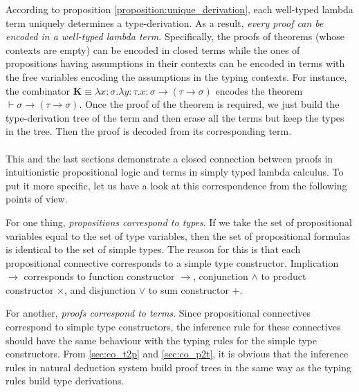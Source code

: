According to proposition \ref{proposition:unique_derivation}, each well-typed lambda term uniquely determines a type-derivation. As a result, \emph{every proof can be encoded in a well-typed lambda term}. Specifically, the proofs of theorems (whose contexts are empty) can be encoded in closed terms while the ones of propositions having assumptions in their contexts can be encoded in terms with the free variables encoding the assumptions in the typing contexts. For instance, the combinator $ \textbf{K} \equiv \lambda x:\sigma . \lambda y:\tau . x: \sigma \to (\tau \to \sigma) $ encodes the theorem $ \vdash \sigma \to (\tau \to \sigma) $. Once the proof of the theorem is required, we just build the type-derivation tree of the term and then erase all the terms but keep the types in the tree. Then the proof is decoded from its corresponding term.
\\
\\
This and the last sections demonstrate a closed connection between proofs in intuitionistic propositional logic and terms in simply typed lambda calculus. To put it more specific, let us have a look at this correspondence from the following points of view.

For one thing, \emph{propositions correspond to types}. If we take the set of propositional variables equal to the set of type variables, then the set of propositional formulas is identical to the set of simple types. The reason for this is that each propositional connective corresponds to a simple type constructor. Implication $ \to $ corresponds to function constructor $ \to $, conjunction $ \land $ to product constructor $ \times $, and disjunction $ \lor $ to sum constructor $ + $.

For another, \emph{proofs correspond to terms}. Since propositional connectives correspond to simple type constructors, the inference rule for these connectives should have the same behaviour with the typing rules for the simple type constructors. From \ref{sec:co_t2p} and \ref{sec:co_p2t}, it is obvious that the inference rules in natural deduction system build proof trees in the same way as the typing rules build type derivations.